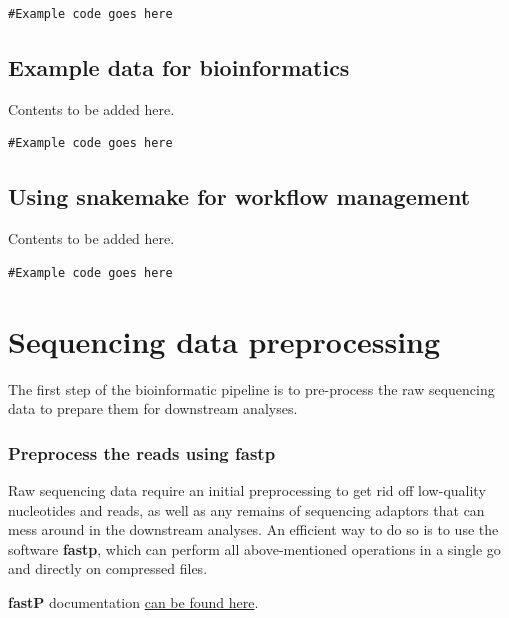 \documentclass[
]{book}
\begin{document}
\begin{verbatim}
#Example code goes here
\end{verbatim}

\hypertarget{example-data-bioinformatics}{%
\section{Example data for bioinformatics}\label{example-data-bioinformatics}}

Contents to be added here.

\begin{verbatim}
#Example code goes here
\end{verbatim}

\hypertarget{using-snakemake}{%
\section{Using snakemake for workflow management}\label{using-snakemake}}

Contents to be added here.

\begin{verbatim}
#Example code goes here
\end{verbatim}

\hypertarget{sequencing-data-preprocessing}{%
\chapter{Sequencing data preprocessing}\label{sequencing-data-preprocessing}}

The first step of the bioinformatic pipeline is to pre-process the raw sequencing data to prepare them for downstream analyses.

\hypertarget{preprocess-the-reads-using-fastp}{%
\subsection*{Preprocess the reads using fastp}\label{preprocess-the-reads-using-fastp}}

Raw sequencing data require an initial preprocessing to get rid off low-quality nucleotides and reads, as well as any remains of sequencing adaptors that can mess around in the downstream analyses. An efficient way to do so is to use the software \textbf{fastp}, which can perform all above-mentioned operations in a single go and directly on compressed files.

\textbf{fastP} documentation \href{https://github.com/OpenGene/fastp}{can be found here}.
\end{document}
